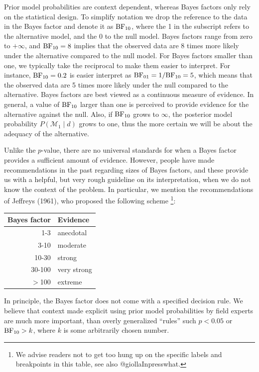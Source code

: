 \documentclass[english,,doc,floatsintext]{apa6}
\let\rmarkdownfootnote\footnote%
\def\footnote{\protect\rmarkdownfootnote}
\begin{document}
Prior model probabilities are context dependent, whereas Bayes factors only rely on the statistical design. To simplify notation we drop the reference to the data in the Bayes factor and denote it as \(\textnormal{BF}_{10}\), where the 1 in the subscript refers to the alternative model, and the 0 to the null model. Bayes factors range from zero to \(+ \infty\), and \(\textnormal{BF}_{10} = 8\) implies that the observed data are 8 times more likely under the alternative compared to the null model. For Bayes factors smaller than one, we typically take the reciprocal to make them easier to interpret. For instance, \(\textnormal{BF}_{10} = 0.2\) is easier interpret as \(\textnormal{BF}_{01} = 1/\textnormal{BF}_{10} = 5\), which means that the observed data are 5 times more likely under the null compared to the alternative. Bayes factors are best viewed as a continuous measure of evidence. In general, a value of \(\textnormal{BF}_{10}\) larger than one is perceived to provide evidence for the alternative against the null. Also, if \(\textnormal{BF}_{10}\) grows to \(\infty\), the posterior model probability \(P(\mathcal{M}_{1} \mid d)\) grows to one, thus the more certain we will be about the adequacy of the alternative.

Unlike the \(p\)-value, there are no universal standards for when a Bayes factor provides a sufficient amount of evidence. However, people have made recommendations in the past regarding sizes of Bayes factors, and these provide us with a helpful, but very rough guideline on its interpretation, when we do not know the context of the problem. In particular, we mention the recommendations of Jeffreys (1961), who proposed the following scheme
\footnote{We advise readers not to get too hung up on the specific labels and breakpoints in this table, see also @giollaInpresswhat.}:

\begin{center}
\begin{tabular}{rl}
Bayes factor & Evidence\\
\hline
1-3 & anecdotal\\
3-10 & moderate\\
10-30 & strong\\
30-100 & very strong\\
\( > \)100 & extreme\\
\end{tabular}
\end{center}

In principle, the Bayes factor does not come with a specified decision rule. We believe that context made explicit using prior model probabilities by field experts are much more important, than overly generalized \enquote{rules} such \(p < 0.05\) or \(\textnormal{BF} _{10} > k\), where \(k\) is some arbitrarily chosen number.
\end{document}
